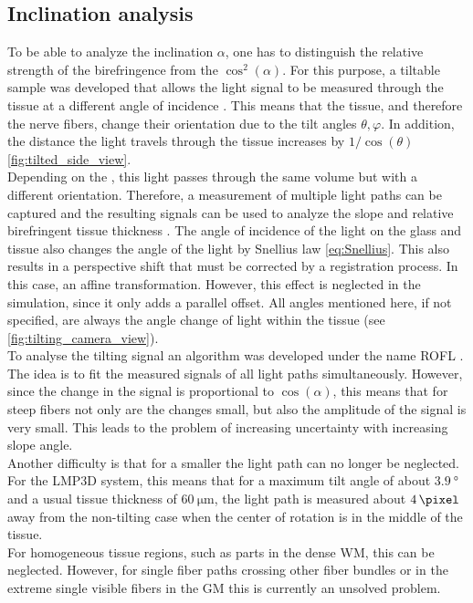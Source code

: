 \subsection{Inclination analysis} \label{sec::InclAnalysis}
%
To be able to analyze the inclination $\alpha$, one has to distinguish the relative strength of the birefringence from the $\cos^2(\alpha)$.
For this purpose, a tiltable sample was developed that allows the light signal to be measured through the tissue at a different angle of incidence \cite{Axer2011}.
This means that the tissue, and therefore the nerve fibers, change their orientation due to the tilt angles $\theta, \varphi$.
In addition, the distance the light travels through the tissue increases by $1/\cos(\theta)$ \cref{fig:tilted_side_view}.
\\
%
Depending on the \Pixelsize{}, this light passes through the same volume but with a different orientation.
Therefore, a measurement of multiple light paths can be captured and the resulting signals can be used to analyze the slope and relative birefringent tissue thickness \trel{}.
The angle of incidence of the light on the glass and tissue also changes the angle of the light by Snellius law \cref{eq:Snellius}.
This also results in a perspective shift that must be corrected by a registration process.
In this case, an affine transformation.
However, this effect is neglected in the simulation, since it only adds a parallel offset.
All angles mentioned here, if not specified, are always the angle change of light within the tissue (see \cref{fig:tilting_camera_view}).
\\
%
To analyse the tilting signal an algorithm was developed under the name \ac{ROFL} \cite{Wiese:887678,Schmitz2018}.
The idea is to fit the measured signals of all light paths simultaneously.
However, since the change in the signal is proportional to $\cos(\alpha)$, this means that for steep fibers not only are the changes small, but also the amplitude of the signal is very small.
This leads to the problem of increasing uncertainty with increasing slope angle.
\\
%
Another difficulty is that for a smaller \Pixelsize{} the light path can no longer be neglected.
For the \ac{LMP3D} system, this means that for a maximum tilt angle of about $\SI{3.9}{\degree}$ and a usual tissue thickness of $\SI{60}{\micro\meter}$, the light path is measured about $\SI{4}{\pixel}$ away from the non-tilting case when the center of rotation is in the middle of the tissue.
\\
%
For homogeneous tissue regions, such as parts in the dense \ac{WM}, this can be neglected.
However, for single fiber paths crossing other fiber bundles or in the extreme single visible fibers in the \ac{GM} this is currently an unsolved problem.
%
%
%
